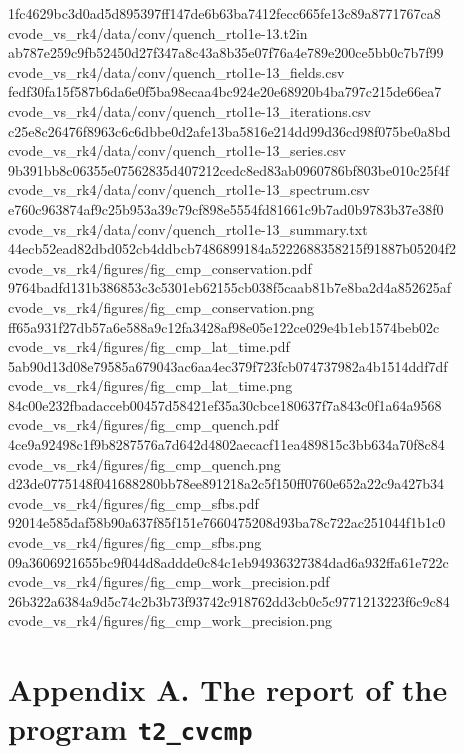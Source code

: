 \documentclass[
  10pt,
]{article}
\newenvironment{Shaded}{}{}
\newcommand{\NormalTok}[1]{#1}
\begin{document}
\begin{Shaded}
\begin{Highlighting}[]
\NormalTok{1fc4629bc3d0ad5d895397ff147de6b63ba7412fecc665fe13c89a8771767ca8  cvode\_vs\_rk4/data/conv/quench\_rtol1e{-}13.t2in}
\NormalTok{ab787e259c9fb52450d27f347a8c43a8b35e07f76a4e789e200ce5bb0c7b7f99  cvode\_vs\_rk4/data/conv/quench\_rtol1e{-}13\_fields.csv}
\NormalTok{fedf30fa15f587b6da6e0f5ba98ecaa4bc924e20e68920b4ba797c215de66ea7  cvode\_vs\_rk4/data/conv/quench\_rtol1e{-}13\_iterations.csv}
\NormalTok{c25e8c26476f8963c6c6dbbe0d2afe13ba5816e214dd99d36cd98f075be0a8bd  cvode\_vs\_rk4/data/conv/quench\_rtol1e{-}13\_series.csv}
\NormalTok{9b391bb8c06355e07562835d407212cedc8ed83ab0960786bf803be010c25f4f  cvode\_vs\_rk4/data/conv/quench\_rtol1e{-}13\_spectrum.csv}
\NormalTok{e760c963874af9c25b953a39c79cf898e5554fd81661c9b7ad0b9783b37e38f0  cvode\_vs\_rk4/data/conv/quench\_rtol1e{-}13\_summary.txt}
\NormalTok{44ecb52ead82dbd052cb4ddbcb7486899184a5222688358215f91887b05204f2  cvode\_vs\_rk4/figures/fig\_cmp\_conservation.pdf}
\NormalTok{9764badfd131b386853c3c5301eb62155cb038f5caab81b7e8ba2d4a852625af  cvode\_vs\_rk4/figures/fig\_cmp\_conservation.png}
\NormalTok{ff65a931f27db57a6e588a9c12fa3428af98e05e122ce029e4b1eb1574beb02c  cvode\_vs\_rk4/figures/fig\_cmp\_lat\_time.pdf}
\NormalTok{5ab90d13d08e79585a679043ac6aa4ec379f723fcb074737982a4b1514ddf7df  cvode\_vs\_rk4/figures/fig\_cmp\_lat\_time.png}
\NormalTok{84c00e232fbadacceb00457d58421ef35a30cbce180637f7a843c0f1a64a9568  cvode\_vs\_rk4/figures/fig\_cmp\_quench.pdf}
\NormalTok{4ce9a92498c1f9b8287576a7d642d4802aecacf11ea489815c3bb634a70f8c84  cvode\_vs\_rk4/figures/fig\_cmp\_quench.png}
\NormalTok{d23de0775148f041688280bb78ee891218a2c5f150ff0760e652a22c9a427b34  cvode\_vs\_rk4/figures/fig\_cmp\_sfbs.pdf}
\NormalTok{92014e585daf58b90a637f85f151e7660475208d93ba78c722ac251044f1b1c0  cvode\_vs\_rk4/figures/fig\_cmp\_sfbs.png}
\NormalTok{09a3606921655bc9f044d8addde0c84c1eb94936327384dad6a932ffa61e722c  cvode\_vs\_rk4/figures/fig\_cmp\_work\_precision.pdf}
\NormalTok{26b322a6384a9d5c74c2b3b73f93742c918762dd3cb0c5c9771213223f6c9c84  cvode\_vs\_rk4/figures/fig\_cmp\_work\_precision.png}
\end{Highlighting}
\end{Shaded}

\hypertarget{appendix-a.-the-report-of-the-program-t2_cvcmp}{%
\section{\texorpdfstring{Appendix A. The report of the program
\texttt{t2\_cvcmp}}{Appendix A. The report of the program t2\_cvcmp}}\label{appendix-a.-the-report-of-the-program-t2_cvcmp}}
\end{document}
